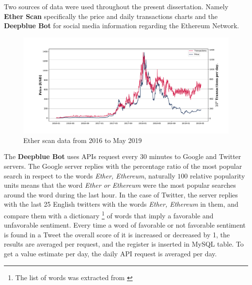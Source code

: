 Two sources of data were used throughout the present dissertation. Namely \textbf{Ether Scan} \cite{ether_scan} specifically the price and daily transactions charts and the \textbf{Deepblue Bot} \cite{deepblueai} for social media information regarding the Ethereum Network. 

\begin{figure}[htpb!] %
	\centering %
	\includegraphics[width=\textwidth]{notebooks/data/ether_scan_price_trans.pdf} %
	\caption{ Ether scan data from 2016 to May 2019  \cite{ether_scan}} %
	\label{fig:introduction_1} %
\end{figure}

The \textbf{Deepblue Bot} uses APIs request every 30 minutes to Google and Twitter servers. The Google server replies with the percentage ratio of the most popular search in respect to the words \textit{Ether, Ethereum}, naturally $100$ relative popularity units means that the word \textit{Ether or Ethereum} were the most popular searches around the word during the last hour. In the case of Twitter, the server replies with the last 25 English twitters with the words  \textit{Ether, Ethereum} in them, and compare them with a dictionary \footnote{The list of words was extracted from \cite{goshima2015estimating}} of words that imply a favorable and unfavorable sentiment. Every time a word of favorable or not favorable sentiment is found in a Tweet the overall score of it is increased or decreased by 1, the results are averaged per request, and the register is inserted in MySQL table. To get a value estimate per day, the daily API request is averaged per day.

